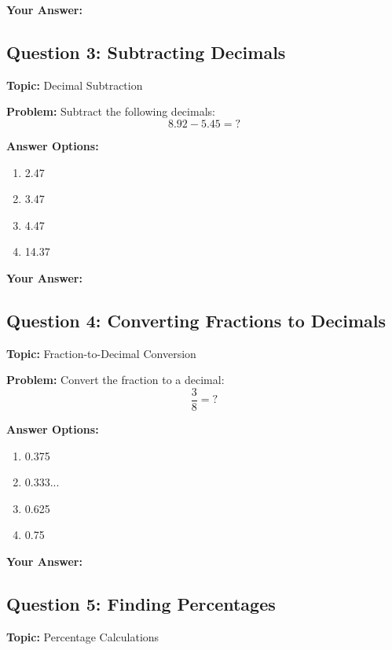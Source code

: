 \documentclass[12pt]{article}
\begin{document}
\noindent\textbf{Your Answer:} \underline{\hspace{2cm}}

\vspace{0.5cm}


\subsection{Question 3: Subtracting Decimals}
\textbf{Topic:} Decimal Subtraction

\textbf{Problem:} Subtract the following decimals:
\[8.92 - 5.45 = ?\]

\textbf{Answer Options:}
\begin{enumerate}[label=\Alph*)]
    \item 2.47
    \item 3.47
    \item 4.47
    \item 14.37
\end{enumerate}

\noindent\textbf{Your Answer:} \underline{\hspace{2cm}}

\vspace{0.5cm}


\subsection{Question 4: Converting Fractions to Decimals}
\textbf{Topic:} Fraction-to-Decimal Conversion

\textbf{Problem:} Convert the fraction to a decimal:
\[\frac{3}{8} = ?\]

\textbf{Answer Options:}
\begin{enumerate}[label=\Alph*)]
    \item 0.375
    \item 0.333...
    \item 0.625
    \item 0.75
\end{enumerate}

\noindent\textbf{Your Answer:} \underline{\hspace{2cm}}

\vspace{0.5cm}


\subsection{Question 5: Finding Percentages}
\textbf{Topic:} Percentage Calculations
\end{document}
